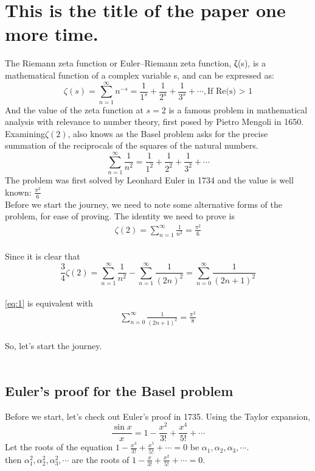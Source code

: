 \chapter*{This is the title of the paper one more time.}
\graphicspath{{./chap1/images/}}   

The Riemann zeta function or Euler–Riemann zeta function, ζ(s), is a mathematical function of a complex variable s, and can be expressed as:
\[
    \zeta(s) = \sum_{n=1}^\infty n^{-s} = \frac{1}{1^s} + \frac{1}{2^s} + \frac{1}{3^s} + \cdots, \textrm{If Re(s) > 1}
\]
And the value of the zeta function at $s = 2$ is a famous problem in mathematical analysis with relevance to number theory, first posed by Pietro Mengoli in 1650. Examining$\zeta(2)$, also knows as the Basel problem asks for the precise summation of the reciprocals of the squares of the natural numbers.
\[
    \sum_{n=1}^\infty \frac{1}{n^2} = \frac{1}{1^2} + \frac{1}{2^2} + \frac{1}{3^2} + \cdots
\]
The problem was first solved by Leonhard Euler in 1734 and the value is well known:  $\frac{\pi^2}{6}$
~\\





Before we start the journey, we need to note some alternative forms of the problem, for ease of proving. The identity we need to prove is
\begin{align}
    \zeta(2) = \sum_{n=1}^\infty \frac{1}{n^2} = \frac{\pi^2}{6} \tag{1}\label{eq:1}
\end{align}~\\
Since it is clear that
\[
    \frac{3}{4}\zeta(2) = \sum_{n=1}^\infty \frac{1}{n^2} -  \sum_{n=1}^\infty \frac{1}{(2n)^2}= \sum_{n=0}^\infty \frac{1}{(2n+1)^2} 
\]~\\
\eqref{eq:1} is equivalent with
\begin{align}
    \sum_{n=0}^\infty \frac{1}{(2n+1)^2} = \frac{\pi^2}{8} \tag{2}\label{eq:2}
\end{align}~\\


So, let's start the journey.\\
~\\
\section{Euler's proof for the Basel problem}
Before we start, let's check out Euler's proof in 1735. Using the Taylor expansion,
\[
    \frac{\sin x}{x} = 1 - \frac{x^2}{3!} + \frac{x^4}{5!}+\cdots
\]
Let the roots of the equation $1 - \frac{x^3}{3!} + \frac{x^5}{5!}+\cdots=0$ be $\alpha_1, \alpha_2, \alpha_3, \cdots$.\\
then $\alpha_1^2, \alpha_2^2, \alpha_3^2, \cdots$ are the roots of $1 - \frac{x}{3!} + \frac{x^2}{5!}+\cdots=0$.~\\

